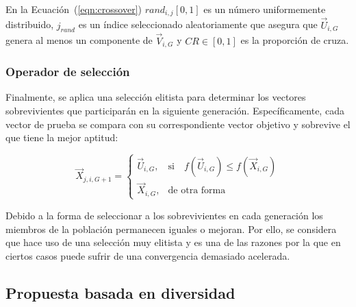 En la Ecuación~(\ref{eqn:crossover}) $rand_{i,j}[0,1]$ es un número uniformemente distribuido, 
$j_{rand}$ es un índice seleccionado aleatoriamente que asegura que $\vec{U}_{i,G}$ genera al menos un componente 
de $\vec{V}_{i,G}$ y $CR \in [0,1]$ es la proporción de cruza.

\subsubsection{Operador de selección}
Finalmente, se aplica una selección elitista para determinar los vectores sobrevivientes que participarán en la siguiente generación.
%
Específicamente, cada vector de prueba se compara con su correspondiente vector objetivo y sobrevive el que tiene la mejor aptitud:

\begin{equation} \label{eqn:selection}
\vec{X}_{j,i,G+1}= 
\begin{cases}
    \vec{U}_{i,G},& \text{si} \quad f(\vec{U}_{i,G}) \leq f(\vec{X}_{i,G})  \\
    \vec{X}_{i,G},              & \text{de otra forma}
\end{cases}
\end{equation}

Debido a la forma de seleccionar a los sobrevivientes en cada generación los miembros de la población permanecen iguales o mejoran.
%
Por ello, se considera que \DE{} hace uso de una selección muy elitista y es una de las razones por la que en ciertos casos puede
sufrir de una convergencia demasiado acelerada.

\subsection{Propuesta basada en diversidad}

